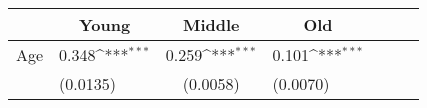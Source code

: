 {
\def\sym#1{\ifmmode^{#1}\else\(^{#1}\)\fi}
\begin{tabular*}{.6\hsize}{@{\hskip\tabcolsep\extracolsep\fill}l*{3}{lc}}
\toprule
                &\multicolumn{1}{c}{Young}&\multicolumn{1}{c}{Middle}&\multicolumn{1}{c}{Old}\\
\midrule
Age \hspace{2ex}&    0.348\sym{***}&    0.259\sym{***}&    0.101\sym{***}\\
                & (0.0135)         & (0.0058)         & (0.0070)         \\
\bottomrule
\end{tabular*}
}
